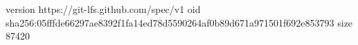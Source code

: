 version https://git-lfs.github.com/spec/v1
oid sha256:05fffde66297ae8392f1fa14ed78d5590264af0b89d671a971501f692e853793
size 87420
